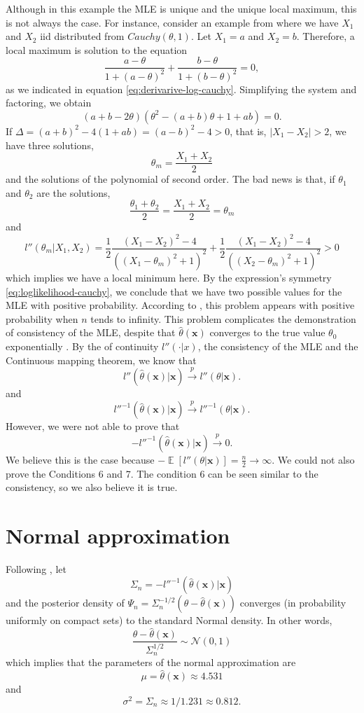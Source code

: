 \documentclass[a4paper,10pt, notitlepage]{report}
\theoremstyle{plain}
\newcommand{\ev}{\operatorname{\mathbb{E}}}
\newcommand{\bx}{\boldsymbol{x}} %
\begin{document}
Although in this example the MLE is unique and the unique local maximum, this
is not always the case.  For instance, consider an example from \cite[Page 122]{young_smith_2005} where we have $X_1$ and $X_2$ iid distributed
from $Cauchy(\theta,1)$. Let $X_1 = a$ and $X_2 = b$. Therefore, a local maximum is solution to the
equation 
$$
\frac{a - \theta}{1 + (a - \theta)^2} + \frac{b - \theta}{1 + (b - \theta)^2} = 0,
$$
as we indicated in equation \ref{eq:derivarive-log-cauchy}. Simplifying the
system and factoring, we obtain 
$$
(a + b - 2\theta)(\theta^2 - (a + b)\theta + 1 + ab) = 0.
$$
If $\Delta = (a+b)^2 - 4(1 + ab) = (a - b)^2 - 4 > 0$, that is, $|X_1 - X_2|
> 2$, we have three solutions, 
$$
\theta_m = \frac{X_1 + X_2}{2}
$$
and the solutions of the polynomial of second order. The bad news is that, if
$\theta_1$ and $\theta_2$ are the solutions, 
$$
\frac{\theta_1 + \theta_2}{2} = \frac{X_1 + X_2}{2} = \theta_m
$$
and 
$$l''(\theta_m|X_1, X_2) = \frac{1}{2}\frac{(X_1 - X_2)^2 - 4}{((X_1 -
\theta_m)^2 + 1)^2} + \frac{1}{2}\frac{(X_1 - X_2)^2 - 4}{((X_2 -
\theta_m)^2 + 1)^2} > 0
$$
which implies we have a local minimum here. By the expression's symmetry \ref{eq:loglikelihood-cauchy}, we conclude that we have two possible values for the MLE with positive probability. According to \cite[]{young_smith_2005}, this problem appears with positive probability when $n$ tends to infinity. This problem complicates the demonstration of consistency of the MLE, despite that $\hat{\theta}(\bx)$ converges to the true value $\theta_0$ exponentially \cite[Page 139]{consistency-mle}. By the of continuity $l''(\cdot|x)$, the consistency of the MLE and the Continuous mapping theorem, we know that 
$$
l''(\hat{\theta}(\bx)|\bx) \overset{p}{\to} l''(\theta|\bx). 
$$
and
$$
l''^{-1}(\hat{\theta}(\bx)|\bx) \overset{p}{\to} l''^{-1}(\theta|\bx).
$$
However, we were not able to prove that 
$$
-l''^{-1}(\hat{\theta}(\bx)|\bx) \overset{p}{\to} 0.
$$
We believe this is the case because $-\ev[l''(\theta|\bx)] = \frac{n}{2} \to \infty$. We could not also prove the Conditions 6 and 7. The condition 6 can be seen similar to the consistency, so we also believe it is true. 

\section*{Normal approximation}

Following \cite[Theorem 7.89]{schervish1996theory}, let 
$$
\Sigma_n = -l''^{-1}(\hat{\theta}(\bx)|\bx)
$$
and the posterior density of $\Psi_n = \Sigma_n^{-1/2}(\theta - \hat{\theta}(\bx))$ converges (in probability uniformly on compact sets) to the standard Normal density. In other words, 
$$
\frac{\theta - \hat{\theta}(\bx)}{\Sigma_n^{1/2}} \sim \mathcal{N}(0,1)
$$
which implies that the parameters of the normal approximation are 
\begin{equation}
    \label{eq:mu-normal-approximation}
    \mu = \hat{\theta}(\bx) \approx 4.531
\end{equation}
and 
\begin{equation}
    \label{eq:sigma-normal-approximation}
    \sigma^2 = \Sigma_n \approx 1/1.231 \approx 0.812.
\end{equation}
\end{document}
